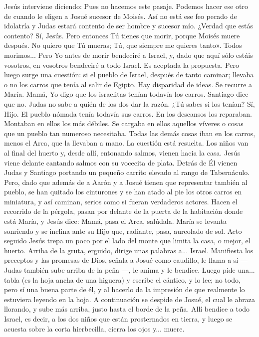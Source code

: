 \documentclass[12pt]{book} %
\begin{document}
Jesús interviene diciendo: 
Pues no hacemos este pasaje. Podemos hacer ese otro de cuando le eligen a Josué sucesor de Moisés. Así no está ese 
feo pecado de idolatría y Judas estará contento de ser hombre y sucesor mío. ¿Verdad que estás contento? 
Sí, Jesús. Pero entonces Tú tienes que morir, porque Moisés muere después. No quiero que Tú mueras; Tú, que 
siempre me quieres tanto». 
Todos morimos... Pero Yo antes de morir bendeciré a Israel, y, dado que aquí sólo estáis vosotros, en vosotros 
bendeciré a todo Israel. 
Es aceptada la propuesta. Pero luego surge una cuestión: si el pueblo de Israel, después de tanto caminar; llevaba o no 
los carros que tenía al salir de Egipto. Hay disparidad de ideas. Se recurre a María. 
Mamá, Yo digo que los israelitas tenían todavía los carros. Santiago dice que no. Judas no sabe a quién de los dos dar 
la razón. ¿Tú sabes si los tenían? 
Sí, Hijo. El pueblo nómada tenía todavía sus carros. En los descansos los reparaban. Montaban en ellos los más débiles. Se cargaba en ellos aquellos víveres o cosas que un pueblo tan numeroso necesitaba. Todas las demás cosas iban en los carros, menos el Arca, que la llevaban a mano. 
La cuestión está resuelta. 
Los niños van al final del huerto y, desde allí, entonando salmos, vienen hacia la casa. Jesús viene delante cantando 
salmos con su vocecita de plata. Detrás de Él vienen Judas y Santiago portando un pequeño carrito elevado al rango de Tabernáculo. Pero, dado que además de a Aarón y a Josué tienen que representar también al pueblo, se han quitado los cinturones y se han atado al pie los otros carros en miniatura, y así caminan, serios como si fueran verdaderos actores. 
Hacen el recorrido de la pérgola, pasan por delante de la puerta de la habitación donde está María, y Jesús dice: 
Mamá, pasa el Arca, salúdala. 
María se levanta sonriendo y se inclina ante su Hijo que, radiante, pasa, aureolado de sol. 
Acto seguido Jesús trepa un poco por el lado del monte que limita la casa, o mejor, el huerto. Arriba de la gruta, 
erguido, dirige unas palabras a... Israel. Manifiesta los preceptos y las promesas de Dios, señala a Josué como caudillo, le llama a sí — Judas también sube arriba de la peña —, le anima y le bendice. Luego pide una... tabla (es la hoja ancha de una higuera) y escribe el cántico, y lo lee; no todo, pero sí una buena parte de él, y al hacerlo da la impresión de que realmente lo estuviera leyendo en la hoja. A continuación se despide de Josué, el cual le abraza llorando, y sube más arriba, justo hasta el borde de la peña. Allí bendice a todo Israel, es decir, a los dos niños que están prosternados en tierra, y luego se acuesta sobre la corta hierbecilla, cierra los ojos y... muere. 
\end{document}
